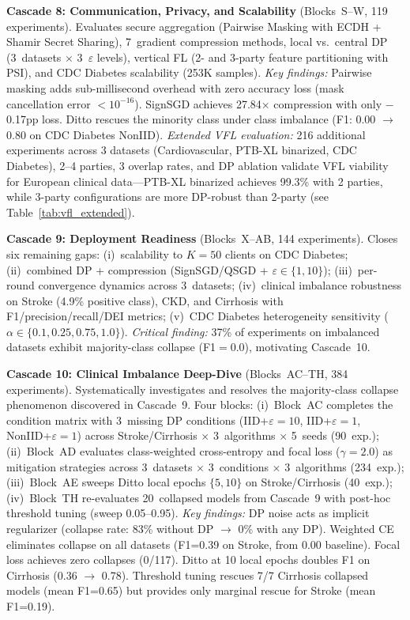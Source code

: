 \documentclass[conference,a4paper]{IEEEtran}
\begin{document}
\smallskip\noindent\textbf{Cascade 8: Communication, Privacy, and Scalability} (Blocks~S--W, 119 experiments). Evaluates secure aggregation (Pairwise Masking with ECDH + Shamir Secret Sharing), 7~gradient compression methods, local vs.\ central DP (3~datasets $\times$ 3~$\varepsilon$ levels), vertical FL (2- and 3-party feature partitioning with PSI), and CDC Diabetes scalability (253K samples). \textit{Key findings:} Pairwise masking adds sub-millisecond overhead with zero accuracy loss (mask cancellation error $<10^{-16}$). SignSGD achieves 27.84$\times$ compression with only $-$0.17pp loss. Ditto rescues the minority class under class imbalance (F1: 0.00 $\to$ 0.80 on CDC Diabetes NonIID). \textit{Extended VFL evaluation:} 216 additional experiments across 3 datasets (Cardiovascular, PTB-XL binarized, CDC Diabetes), 2--4 parties, 3 overlap rates, and DP ablation validate VFL viability for European clinical data---PTB-XL binarized achieves 99.3\% with 2 parties, while 3-party configurations are more DP-robust than 2-party (see Table~\ref{tab:vfl_extended}).

\smallskip\noindent\textbf{Cascade 9: Deployment Readiness} (Blocks~X--AB, 144 experiments). Closes six remaining gaps: (i)~scalability to $K{=}50$ clients on CDC Diabetes; (ii)~combined DP + compression (SignSGD/QSGD + $\varepsilon{\in}\{1, 10\}$); (iii)~per-round convergence dynamics across 3~datasets; (iv)~clinical imbalance robustness on Stroke (4.9\% positive class), CKD, and Cirrhosis with F1/precision/recall/DEI metrics; (v)~CDC Diabetes heterogeneity sensitivity ($\alpha{\in}\{0.1, 0.25, 0.75, 1.0\}$). \textit{Critical finding:} 37\% of experiments on imbalanced datasets exhibit majority-class collapse (F1$=$0.0), motivating Cascade~10.

\smallskip\noindent\textbf{Cascade 10: Clinical Imbalance Deep-Dive} (Blocks~AC--TH, 384 experiments). Systematically investigates and resolves the majority-class collapse phenomenon discovered in Cascade~9. Four blocks: (i)~Block~AC completes the condition matrix with 3~missing DP conditions (IID+$\varepsilon{=}10$, IID+$\varepsilon{=}1$, NonIID+$\varepsilon{=}1$) across Stroke/Cirrhosis $\times$ 3~algorithms $\times$ 5~seeds (90~exp.); (ii)~Block~AD evaluates class-weighted cross-entropy and focal loss ($\gamma{=}2.0$) as mitigation strategies across 3~datasets $\times$ 3~conditions $\times$ 3~algorithms (234~exp.); (iii)~Block~AE sweeps Ditto local epochs $\{5, 10\}$ on Stroke/Cirrhosis (40~exp.); (iv)~Block~TH re-evaluates 20~collapsed models from Cascade~9 with post-hoc threshold tuning (sweep 0.05--0.95). \textit{Key findings:} DP noise acts as implicit regularizer (collapse rate: 83\% without DP $\to$ 0\% with any DP). Weighted CE eliminates collapse on all datasets (F1=0.39 on Stroke, from 0.00 baseline). Focal loss achieves zero collapses (0/117). Ditto at 10 local epochs doubles F1 on Cirrhosis (0.36 $\to$ 0.78). Threshold tuning rescues 7/7 Cirrhosis collapsed models (mean F1=0.65) but provides only marginal rescue for Stroke (mean F1=0.19).
\end{document}
